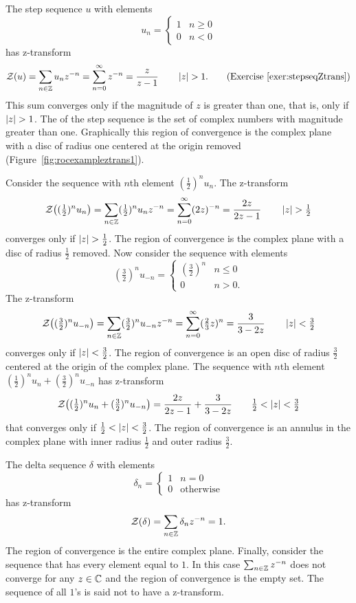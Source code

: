 The step sequence $u$ with elements
\[
u_n = \begin{cases} 
1 & n \geq 0 \\
0 & n < 0 
\end{cases}
\]
has z-transform
\[
{\mathcal Z}(u) = \sum_{n \in {\mathbb Z}} u_n z^{-n} = \sum_{n=0}^\infty z^{-n} = \frac{z}{z - 1} \qquad \left\vert z \right\vert > 1. \qquad \text{(Exercise~\ref{exer:stepseqZtrans})}
\]
This sum converges only if the magnitude of $z$ is greater than one, that is, only if $\left\vert z \right\vert > 1$.  The  of the step sequence is the set of complex numbers with magnitude greater than one.  Graphically this region of convergence is the complex plane with a disc of radius one centered at the origin removed (Figure~\ref{fig:rocexampleztrans1}).

Consider the sequence with $n$th element $(\tfrac{1}{2})^{n} u_n$.  The z-transform
\[
{\mathcal Z}\big( (\tfrac{1}{2})^{n} u_n\big) = \sum_{n \in {\mathbb Z}} (\tfrac{1}{2})^{n} u_n z^{-n} = \sum_{n=0}^\infty (2z)^{-n} = \frac{2z}{2z - 1} \qquad \left\vert z \right\vert > \tfrac{1}{2} 
\]
converges only if $\left\vert z \right\vert > \tfrac{1}{2}$.  The region of convergence is the complex plane with a disc of radius $\tfrac{1}{2}$ removed.  Now consider the sequence with elements 
\[
(\tfrac{3}{2})^{n} u_{-n} =  \begin{cases} 
(\tfrac{3}{2})^{n} & n \leq 0 \\
0 & n > 0.
\end{cases}
\]
The z-transform
\[
{\mathcal Z}\big( (\tfrac{3}{2})^n u_{-n} \big) = \sum_{n \in {\mathbb Z}} (\tfrac{3}{2})^{n} u_{-n} z^{-n} = \sum_{n=0}^\infty (\tfrac{2}{3} z)^{n} = \frac{3}{3 - 2z} \qquad \left\vert z \right\vert < \tfrac{3}{2}
\]
converges only if $\left\vert z \right\vert < \tfrac{3}{2}$.  The region of convergence is an open disc of radius $\frac{3}{2}$ centered at the origin of the complex plane.  The sequence with $n$th element $(\tfrac{1}{2})^{n} u_n + (\frac{3}{2})^{n} u_{-n}$ has z-transform
\[
{\mathcal Z}\big((\tfrac{1}{2})^{n} u_n + (\tfrac{3}{2})^{n} u_{-n}\big) =  \frac{2z}{2z - 1} + \frac{3}{3 - 2z} \qquad \tfrac{1}{2} < \left\vert z \right\vert < \tfrac{3}{2}
\]
that converges only if $\tfrac{1}{2} < \left\vert z \right\vert < \tfrac{3}{2}$.  The region of convergence is an annulus in the complex plane with inner radius $\tfrac{1}{2}$ and outer radius $\tfrac{3}{2}$.

The delta sequence $\delta$ with elements
\[
\delta_n = \begin{cases}
1 & n = 0 \\
0 & \text{otherwise}
\end{cases}
\]  
has z-transform
\[
{\mathcal Z}(\delta) = \sum_{n \in {\mathbb Z}} \delta_n z^{-n} = 1.
\]
The region of convergence is the entire complex plane.  Finally, consider the sequence that has every element equal to $1$.  In this case $\sum_{n \in {\mathbb Z}} z^{-n}$ does not converge for any $z \in {\mathbb C}$ and the region of convergence is the empty set.  The sequence of all $1$'s is said not to have a z-transform.

